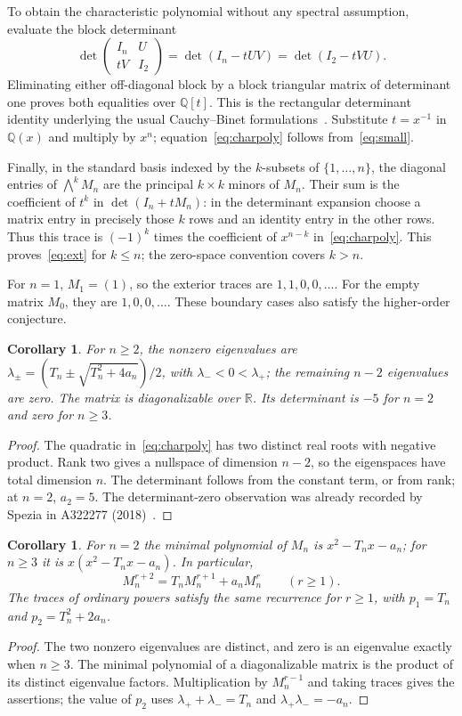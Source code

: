 \documentclass[11pt]{article}
\newtheorem{corollary}[theorem]{Corollary}
\begin{document}
To obtain the characteristic polynomial without any spectral assumption,
evaluate the block determinant
\[
\det\begin{pmatrix}I_n&U\\tV&I_2\end{pmatrix}
=\det(I_n-tUV)=\det(I_2-tVU).
\]
Eliminating either off-diagonal block by a block triangular matrix of
determinant one proves both equalities over $\mathbb Q[t]$.
This is the rectangular determinant identity underlying the usual
Cauchy--Binet formulations~\cite{knill}.
Substitute $t=x^{-1}$ in $\mathbb Q(x)$ and multiply by $x^n$;
equation~\eqref{eq:charpoly} follows from~\eqref{eq:small}.

Finally, in the standard basis indexed by the $k$-subsets of
$\{1,\ldots,n\}$, the diagonal entries of $\bigwedge^k M_n$ are the
principal $k\times k$ minors of $M_n$.
Their sum is the coefficient of $t^k$ in $\det(I_n+tM_n)$:
in the determinant expansion choose a matrix entry in precisely those
$k$ rows and an identity entry in the other rows.
Thus this trace is $(-1)^k$ times the coefficient of $x^{n-k}$
in~\eqref{eq:charpoly}. This proves~\eqref{eq:ext} for $k\leq n$;
the zero-space convention covers $k>n$.

For $n=1$, $M_1=(1)$, so the exterior traces are $1,1,0,0,\ldots$.
For the empty matrix $M_0$, they are $1,0,0,\ldots$.
These boundary cases also satisfy the higher-order conjecture.

\begin{corollary}\label{cor:spectrum}
For $n\geq2$, the nonzero eigenvalues are
$\lambda_\pm=(T_n\pm\sqrt{T_n^2+4a_n})/2$, with
$\lambda_-<0<\lambda_+$; the remaining $n-2$ eigenvalues are zero.
The matrix is diagonalizable over $\mathbb R$.
Its determinant is $-5$ for $n=2$ and zero for $n\geq3$.
\end{corollary}
\begin{proof}
The quadratic in~\eqref{eq:charpoly} has two distinct real roots with
negative product. Rank two gives a nullspace of dimension $n-2$,
so the eigenspaces have total dimension $n$. The determinant follows from
the constant term, or from rank; at $n=2$, $a_2=5$.
The determinant-zero observation was already recorded by Spezia in
A322277 (2018)~\cite{s322277}.
\end{proof}

\begin{corollary}\label{cor:powers}
For $n=2$ the minimal polynomial of $M_n$ is $x^2-T_nx-a_n$;
for $n\geq3$ it is $x(x^2-T_nx-a_n)$. In particular,
\[
M_n^{r+2}=T_nM_n^{r+1}+a_nM_n^r\qquad(r\geq1).
\]
The traces of ordinary powers satisfy the same recurrence for $r\geq1$,
with $p_1=T_n$ and $p_2=T_n^2+2a_n$.
\end{corollary}
\begin{proof}
The two nonzero eigenvalues are distinct, and zero is an eigenvalue
exactly when $n\geq3$. The minimal polynomial of a diagonalizable matrix
is the product of its distinct eigenvalue factors. Multiplication by
$M_n^{r-1}$ and taking traces gives the assertions; the value of $p_2$
uses $\lambda_++\lambda_-=T_n$ and $\lambda_+\lambda_-=-a_n$.
\end{proof}
\end{document}
